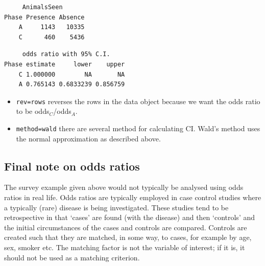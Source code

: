 \documentclass[
  oneside]{krantz}
\newenvironment{Shaded}{\begin{snugshade}}{\end{snugshade}}
\newcommand{\AttributeTok}[1]{\textcolor[rgb]{0.77,0.63,0.00}{#1}}
\newcommand{\CommentTok}[1]{\textcolor[rgb]{0.56,0.35,0.01}{\textit{#1}}}
\newcommand{\FunctionTok}[1]{\textcolor[rgb]{0.00,0.00,0.00}{#1}}
\newcommand{\NormalTok}[1]{#1}
\newcommand{\OtherTok}[1]{\textcolor[rgb]{0.56,0.35,0.01}{#1}}
\newcommand{\SpecialCharTok}[1]{\textcolor[rgb]{0.00,0.00,0.00}{#1}}
\newcommand{\StringTok}[1]{\textcolor[rgb]{0.31,0.60,0.02}{#1}}
\begin{document}
\begin{verbatim}
     AnimalsSeen
Phase Presence Absence
    A     1143   10335
    C      460    5436
\end{verbatim}

\begin{Shaded}
\end{Shaded}

\begin{verbatim}
     odds ratio with 95% C.I.
Phase estimate     lower    upper
    C 1.000000        NA       NA
    A 0.765143 0.6833239 0.856759
\end{verbatim}

\begin{itemize}
\item
  \texttt{rev=\textquotesingle{}rows\textquotesingle{}} reverses the rows in the data object because we want the odds ratio to be odds\(_C\)/odds\(_A\).
\item
  \texttt{method=\textquotesingle{}wald\textquotesingle{}} there are several method for calculating CI. Wald's method uses the normal approximation as described above.
\end{itemize}

\hypertarget{final-note-on-odds-ratios}{%
\subsection{Final note on odds ratios}\label{final-note-on-odds-ratios}}

The survey example given above would not typically be analysed using odds ratios in real life. Odds ratios are typically employed in case control studies where a typically (rare) disease is being investigated. These studies tend to be retrospective in that `cases' are found (with the disease) and then `controls' and the initial circumstances of the cases and controls are compared\citep{Lewallen&Courtright1998}. Controls are created such that they are matched, in some way, to cases, for example by age, sex, smoker etc. The matching factor is not the variable of interest; if it is, it should not be used as a matching criterion.
\end{document}
